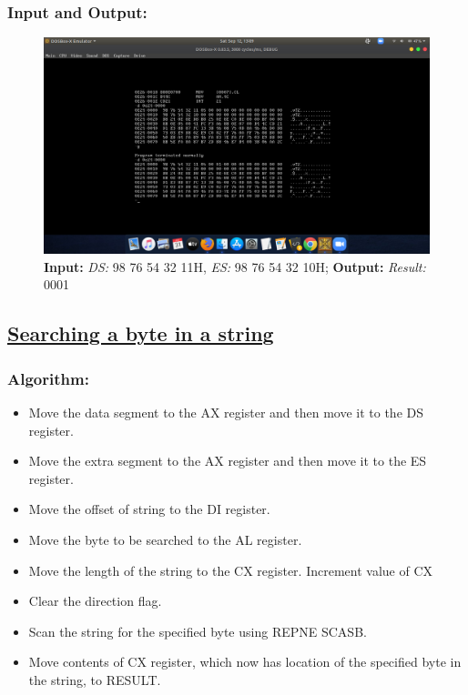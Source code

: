 \documentclass[12pt,a4paper]{article}
\begin{document}
\begin{flushleft}
\subsubsection*{\textbf{Input and Output:}}
\begin{figure}[h]
    \centering
    \includegraphics[trim = 100mm 60mm 100mm 80mm, clip, width = \textwidth]{Pics/StrcmpIO.png}
    \caption{ \textbf{Input:} \emph{DS:} 98 76 54 32 11H, \emph{ES:} 98 76 54 32 10H; \newline \hspace{1cm}
              \textbf{Output:} \emph{Result:} 0001 }
\end{figure}
\subsection*{\textbf{\underline{Searching a byte in a string}}}

\subsubsection*{\textbf{Algorithm:}}
\begin{itemize}
    \item Move the data segment to the AX register and then move it to the DS register.
    \item Move the extra segment to the AX register and then move it to the ES register.
    \item Move the offset of string to the DI register.
    \item Move the byte to be searched to the AL register. 
    \item Move the length of the string to the CX register. Increment value of CX
    \item Clear the direction flag. 
    \item Scan the string for the specified byte using REPNE SCASB.
    \item Move contents of CX register, which now has location of the specified byte in the string, to RESULT.
\end{itemize}


\end{flushleft}
\end{document}
